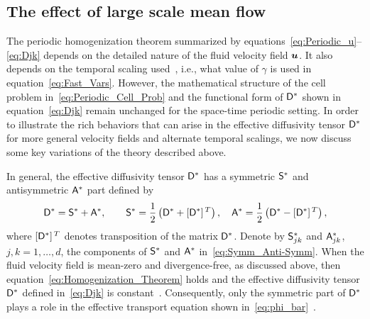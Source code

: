 \documentclass[amsa]{ipart}
\begin{document}
\subsection{The effect of large scale mean flow}\label{sec:Mean_Flow}
%
The periodic homogenization theorem summarized by
equations~\eqref{eq:Periodic_u}--\eqref{eq:Djk}
%
%
depends on the detailed nature of the fluid velocity field
$\boldsymbol{u}$. It also depends on the temporal scaling
used~\cite{Bhattacharya:1989:ASD,Pavliotis:PHD_Thesis,Majda:Kramer:1999:book},
i.e., what value of $\gamma$ is used in
equation~\eqref{eq:Fast_Vars}. However, the mathematical structure of
the cell problem in~\eqref{eq:Periodic_Cell_Prob} and the functional
form of $\mathsf{D}^*$ shown in equation~\eqref{eq:Djk} remain unchanged for 
the space-time periodic setting.  
In order to illustrate the rich behaviors that can arise in the
effective diffusivity tensor $\mathsf{D}^*$ for more general velocity fields
and alternate temporal scalings, we now discuss some key
variations of the theory described above.







In general, the effective diffusivity tensor $\mathsf{D}^*$ has a symmetric
$\mathsf{S}^*$ and antisymmetric $\mathsf{A}^*$ part defined by 
%
\begin{align}\label{eq:Symm_Anti-Symm}
  \Dm^*=\Sm^*+\Am^*,\qquad
  \Sm^*=\frac{1}{2}\left(\Dm^*+[\Dm^*]^{\,T}\right), \quad
  \Am^*=\frac{1}{2}\left(\Dm^*-[\Dm^*]^{\,T}\right),
\end{align}
%
where $[\mathsf{D}^*]^{\,T}$ denotes transposition of the matrix
$\mathsf{D}^*$. Denote by $\mathsf{S}^*_{jk}$ and $\mathsf{A}^*_{jk}$, $j,k=1,\ldots,d$, the
components of $\mathsf{S}^*$ and $\mathsf{A}^*$ in~\eqref{eq:Symm_Anti-Symm}.
When the fluid velocity field is mean-zero and divergence-free, as
discussed above, then 
equation~\eqref{eq:Homogenization_Theorem} holds and the effective
diffusivity tensor $\mathsf{D}^*$ defined in~\eqref{eq:Djk} is
constant~\cite{Majda:Kramer:1999:book}. Consequently, only the symmetric part of $\mathsf{D}^*$ plays a role in the effective transport
equation shown in~\eqref{eq:phi_bar}~\cite{Pavliotis:PHD_Thesis}.
\end{document}
